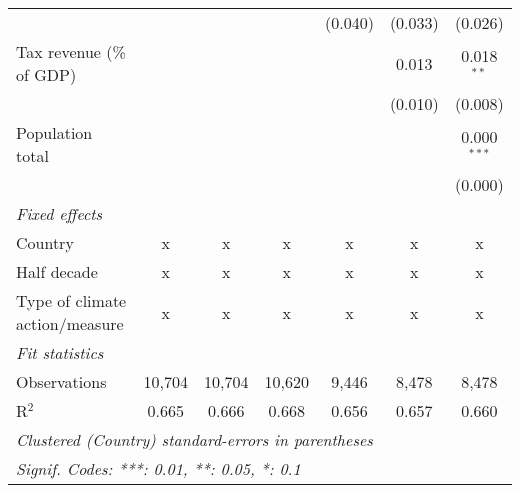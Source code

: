 \begin{tabular}{lcccccc}
                                                     &         &                &                & (0.040)        & (0.033)        & (0.026)\\   
   Tax revenue (\% of GDP)                           &         &                &                &                & 0.013          & 0.018$^{**}$\\   
                                                     &         &                &                &                & (0.010)        & (0.008)\\   
   Population total                                  &         &                &                &                &                & 0.000$^{***}$\\   
                                                     &         &                &                &                &                & (0.000)\\   
   \emph{Fixed effects}\\
   Country                                           & x       & x              & x              & x              & x              & x\\  
   Half decade                                       & x       & x              & x              & x              & x              & x\\  
   Type of climate action/measure                    & x       & x              & x              & x              & x              & x\\  
   \midrule \emph{Fit statistics}\\
   Observations                                      & 10,704  & 10,704         & 10,620         & 9,446          & 8,478          & 8,478\\  
   R$^2$                                             & 0.665   & 0.666          & 0.668          & 0.656          & 0.657          & 0.660\\  
   \midrule
   \multicolumn{7}{l}{\emph{Clustered (Country) standard-errors in parentheses}}\\
   \multicolumn{7}{l}{\emph{Signif. Codes: ***: 0.01, **: 0.05, *: 0.1}}\\
\end{tabular}
\par\endgroup


